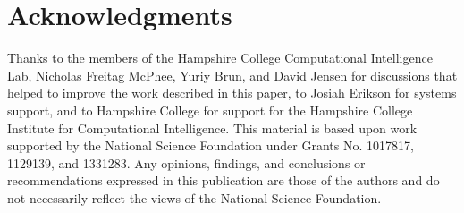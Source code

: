 \documentclass{sig-alternate}
\begin{document}



%




\section{Acknowledgments}

Thanks to the members of the Hampshire College Computational Intelligence Lab, Nicholas Freitag McPhee, Yuriy Brun, and David Jensen for discussions that helped to improve the work described in this paper, to Josiah Erikson for systems support, and to Hampshire College for support for the Hampshire College Institute for Computational Intelligence. This material is based upon work supported by the National Science Foundation under Grants No. 1017817, 1129139, and 1331283. Any opinions, findings, and conclusions or recommendations expressed in this publication are those of the authors and do not necessarily reflect the views of the National Science Foundation.
\end{document}

